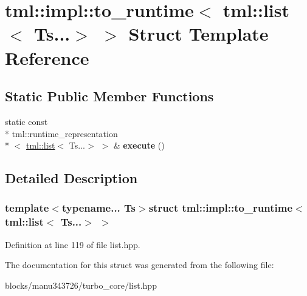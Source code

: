 \hypertarget{structtml_1_1impl_1_1to__runtime_3_01tml_1_1list_3_01_ts_8_8_8_4_01_4}{\section{tml\+:\+:impl\+:\+:to\+\_\+runtime$<$ tml\+:\+:list$<$ Ts...$>$ $>$ Struct Template Reference}
\label{structtml_1_1impl_1_1to__runtime_3_01tml_1_1list_3_01_ts_8_8_8_4_01_4}
}
\subsection*{Static Public Member Functions}
\begin{DoxyCompactItemize}
\item 
\hypertarget{structtml_1_1impl_1_1to__runtime_3_01tml_1_1list_3_01_ts_8_8_8_4_01_4_a8d3c31f7dc06723fa08b48c705e59292}{static const \\*
tml\+::runtime\+\_\+representation\\*
$<$ \hyperlink{structtml_1_1list}{tml\+::list}$<$ Ts...$>$ $>$ \& {\bfseries execute} ()}\label{structtml_1_1impl_1_1to__runtime_3_01tml_1_1list_3_01_ts_8_8_8_4_01_4_a8d3c31f7dc06723fa08b48c705e59292}

\end{DoxyCompactItemize}


\subsection{Detailed Description}
\subsubsection*{template$<$typename... Ts$>$struct tml\+::impl\+::to\+\_\+runtime$<$ tml\+::list$<$ Ts...$>$ $>$}



Definition at line 119 of file list.\+hpp.



The documentation for this struct was generated from the following file\+:\begin{DoxyCompactItemize}
\item 
blocks/manu343726/turbo\+\_\+core/list.\+hpp\end{DoxyCompactItemize}

